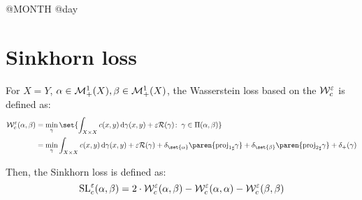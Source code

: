\documentclass[11pt,a4paper]{article}
\begin{document}

{\Huge @MONTH @day}

\section*{Sinkhorn loss}

For $X=Y$, $\alpha \in \mathcal{M}_{+}^1(X), \beta \in \mathcal{M}_{+}^1(X)$, the Wasserstein loss based on the $\mathcal{W}_{c}^{\varepsilon}$ is defined as:
\begin{align}
    \label{eqn:wasserstein-loss}
    \Wce(\alpha, \beta) &= \min_{\gamma} \set{ \int_{\XX} c(x, y) \d \gamma(x, y) + \eps \R(\gamma) \st \gamma \in \Pi(\alpha, \beta)} \\
                        &= \min_{\gamma} \int_{\XX} c(x, y) \d \gamma(x, y) + \eps \R(\gamma) + \delta_{\set{\alpha}}\paren{ \pf{\proj{1}}\gamma } + \delta_{\set{\beta}}\paren{\pf{\proj{2}}\gamma} + \delta_{+}(\gamma)
\end{align}

Then, the Sinkhorn loss is defined as:
\begin{equation}
    \mathrm{SL}_{c}^\varepsilon(\alpha, \beta) = 2\cdot \mathcal{W}_{c}^{\varepsilon}(\alpha, \beta) - \mathcal{W}_{c}^{\varepsilon}(\alpha, \alpha) - \mathcal{W}_{c}^{\varepsilon}(\beta, \beta)
\end{equation}
\end{document}
